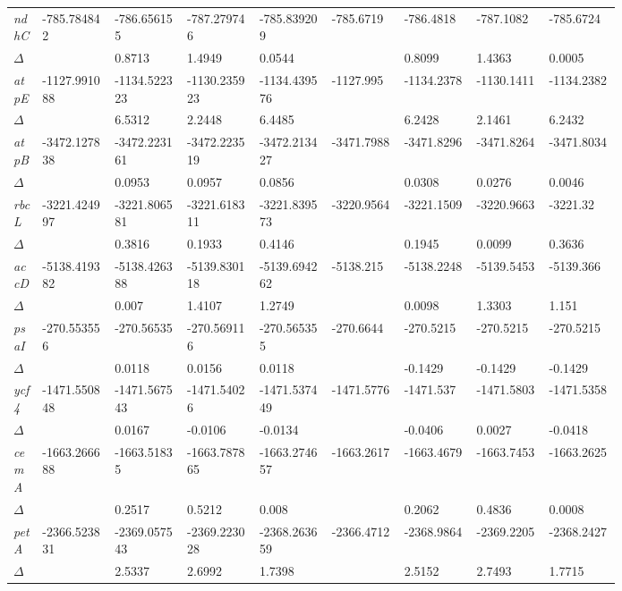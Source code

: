 \documentclass[a4paper]{article}
\begin{document}
\begin{longtable}{p{0.03\linewidth}|p{0.095\linewidth}p{0.095\linewidth}p{0.095\linewidth}p{0.095\linewidth}|p{0.095\linewidth}p{0.095\linewidth}p{0.095\linewidth}p{0.095\linewidth}}
\textit{ndhC} & -785.784842 & -786.656155 & -787.279746 & -785.839209 & -785.6719 & -786.4818 & -787.1082 & -785.6724\\
$\Delta$ &  & 0.8713 & 1.4949 & 0.0544 &  & 0.8099 & 1.4363 & 0.0005\\
 \rowcolor{black!20} \textit{atpE} & -1127.991088 & -1134.522323 & -1130.235923 & -1134.439576 & -1127.995 & -1134.2378 & -1130.1411 & -1134.2382\\
 \rowcolor{black!20} $\Delta$ &  & 6.5312 & 2.2448 & 6.4485 &  & 6.2428 & 2.1461 & 6.2432\\
\textit{atpB} & -3472.127838 & -3472.223161 & -3472.223519 & -3472.213427 & -3471.7988 & -3471.8296 & -3471.8264 & -3471.8034\\
$\Delta$ &  & 0.0953 & 0.0957 & 0.0856 &  & 0.0308 & 0.0276 & 0.0046\\
 \rowcolor{black!20} \textit{rbcL} & -3221.424997 & -3221.806581 & -3221.618311 & -3221.839573 & -3220.9564 & -3221.1509 & -3220.9663 & -3221.32\\
 \rowcolor{black!20} $\Delta$ &  & 0.3816 & 0.1933 & 0.4146 &  & 0.1945 & 0.0099 & 0.3636\\
\textit{accD} & -5138.419382 & -5138.426388 & -5139.830118 & -5139.694262 & -5138.215 & -5138.2248 & -5139.5453 & -5139.366\\
$\Delta$ &  & 0.007 & 1.4107 & 1.2749 &  & 0.0098 & 1.3303 & 1.151\\
 \rowcolor{black!20} \textit{psaI} & -270.553556 & -270.56535 & -270.569116 & -270.565355 & -270.6644 & -270.5215 & -270.5215 & -270.5215\\
 \rowcolor{black!20} $\Delta$ &  & 0.0118 & 0.0156 & 0.0118 &  & -0.1429 & -0.1429 & -0.1429\\
\textit{ycf4} & -1471.550848 & -1471.567543 & -1471.54026 & -1471.537449 & -1471.5776 & -1471.537 & -1471.5803 & -1471.5358\\
$\Delta$ &  & 0.0167 & -0.0106 & -0.0134 &  & -0.0406 & 0.0027 & -0.0418\\
 \rowcolor{black!20} \textit{cemA} & -1663.266688 & -1663.51835 & -1663.787865 & -1663.274657 & -1663.2617 & -1663.4679 & -1663.7453 & -1663.2625\\
 \rowcolor{black!20} $\Delta$ &  & 0.2517 & 0.5212 & 0.008 &  & 0.2062 & 0.4836 & 0.0008\\
\textit{petA} & -2366.523831 & -2369.057543 & -2369.223028 & -2368.263659 & -2366.4712 & -2368.9864 & -2369.2205 & -2368.2427\\
$\Delta$ &  & 2.5337 & 2.6992 & 1.7398 &  & 2.5152 & 2.7493 & 1.7715\\

\end{longtable}
\end{document}
